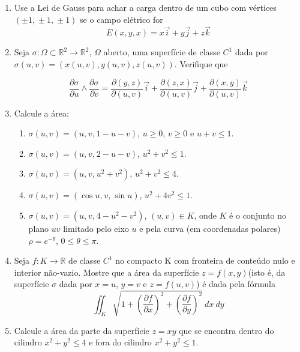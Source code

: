 \documentclass[11pt,a4paper]{article}
\begin{document}
\begin{enumerate}
     \item Use a Lei de Gauss para achar a carga dentro de um cubo com vértices $(\pm 1 \textrm{,}\ \pm 1 \textrm{,}\ \pm 1)$ se o campo elétrico for
     $$E(x,y,x) = x\vec{i} + y\vec{j} + z\vec{k}$$
     
\item Seja $\sigma:\Omega \subset \mathbb{R}^2 \to \mathbb{R}^2$, $\Omega$ aberto, uma superfície de classe $C^1$ dada por $\sigma (u,v) = (x(u,v), y(u,v), z(u,v))$. Verifique que

$$\displaystyle\dfrac{\partial \sigma}{\partial u} \wedge \displaystyle\dfrac{\partial \sigma}{\partial v} = \displaystyle\dfrac{\partial (y,z)}{\partial (u,v)}\vec{i} + \displaystyle\dfrac{\partial (z,x)}{\partial (u,v)}\vec{j} + \displaystyle\dfrac{\partial (x,y)}{\partial (u,v)}\vec{k}$$

\item Calcule a área: 

\begin{enumerate}
\item $\sigma (u,v) = (u \textrm{,}\ v \textrm{,}\ 1 - u - v)$, $u \geq 0$, $v \geq 0$ e $u + v \leq 1$.
\item $\sigma (u,v) = (u \textrm{,}\ v \textrm{,}\ 2 - u - v)$, $u^2 + v^2 \leq 1$.
\item $\sigma (u,v) = (u \textrm{,}\ v \textrm{,}\ u^2 + v^2)$, $u^2 + v^2 \leq 4$.
\item $\sigma (u,v) = (\cos u \textrm{,}\ v \textrm{,}\ \sin u)$, $u^2 + 4v^2 \leq 1$.
\item $\sigma (u,v) = (u \textrm{,}\ v \textrm{,}\ 4 - u^2 - v^2)$, $(u,v) \in K$, onde $K$ é o conjunto no plano $uv$ limitado pelo eixo $u$ e pela curva (em coordenadas polares) $\rho = e^{-\theta}$, $0 \leq \theta \leq \pi$.

\end{enumerate}
      
\item Seja $f:K \to \mathbb{R}$ de classe $C^1$ no compacto K com fronteira de conteúdo nulo e interior não-vazio. Mostre que a área da superfície $z = f(x,y)$(isto é, da superfície $\sigma$ dada por $x = u$, $y = v$ e $z = f(u,v)$) é dada pela fórmula
$$\displaystyle\iint_K \sqrt{1 + \left(\displaystyle\dfrac{\partial f}{\partial x}\right)^2 + \left(\displaystyle\dfrac{\partial f}{\partial y}\right)^2} \ dx \ dy$$ 

\item Calcule a área da parte da superfície $z = xy$ que se encontra dentro do cilindro $x^2 + y^2 \leq 4$ e fora do cilindro $x^2 + y^2 \leq 1$.


\end{enumerate}
\end{document}
